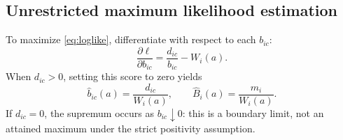 \documentclass[a4paper,11pt]{article}
\begin{document}
\subsection{Unrestricted maximum likelihood estimation}\label{sec:unrestricted}
To maximize \eqref{eq:loglike}, differentiate with respect to each $b_{ic}$:
\begin{equation}\label{eq:bscore}
\frac{\partial\ell}{\partial b_{ic}}=\frac{d_{ic}}{b_{ic}}-W_i(a).
\end{equation}
When $d_{ic}>0$, setting this score to zero yields
\begin{equation}\label{eq:bhat}
\boxed{\widehat b_{ic}(a)=\frac{d_{ic}}{W_i(a)},\qquad
\widehat B_i(a)=\frac{m_i}{W_i(a)}.}
\end{equation}
If $d_{ic}=0$, the supremum occurs as $b_{ic}\downarrow0$: this is a boundary limit, not an attained maximum under the strict positivity assumption.
\end{document}
